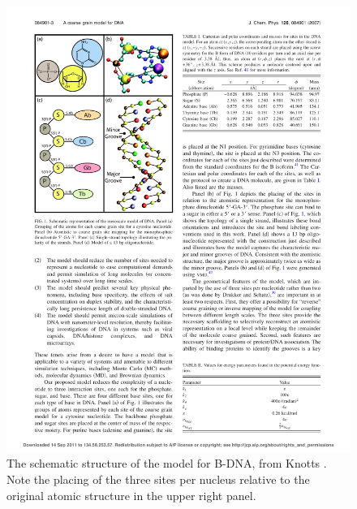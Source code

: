 \begin{figure}[h]
\begin{center}
\includegraphics{schematic_structure_knotts}
\caption{The schematic structure of the model for B-DNA, from Knotts \etal \cite{knotts2007coarse}. Note the placing of the three sites per nucleus relative to the original atomic structure in the upper right panel.}
\label{schematic_knotts}
\end{center}
\end{figure}

